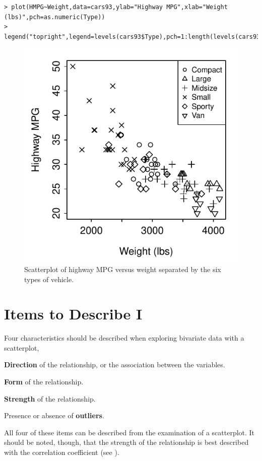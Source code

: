 \documentclass[10pt,openany]{book}\usepackage[]{graphicx}\usepackage[]{color}
\makeatletter
\newenvironment{kframe}{%
 \def\at@end@of@kframe{}%
 \ifinner\ifhmode%
  \def\at@end@of@kframe{\end{minipage}}%
  \begin{minipage}{\columnwidth}%
 \fi\fi%
 \def\FrameCommand##1{\hskip\@totalleftmargin \hskip-\fboxsep
 \colorbox{shadecolor}{##1}\hskip-\fboxsep
     \hskip-\linewidth \hskip-\@totalleftmargin \hskip\columnwidth}%
 \MakeFramed {\advance\hsize-\width
   \@totalleftmargin\z@ \linewidth\hsize
   \@setminipage}}%
 {\par\unskip\endMakeFramed%
 \at@end@of@kframe}
\newenvironment{knitrout}{}{} %
\makeatother
\begin{document}
\begin{knitrout}
\color{fgcolor}\begin{kframe}
\begin{verbatim}
> plot(HMPG~Weight,data=cars93,ylab="Highway MPG",xlab="Weight (lbs)",pch=as.numeric(Type))
> legend("topright",legend=levels(cars93$Type),pch=1:length(levels(cars93$Type)),cex=0.75)
\end{verbatim}
\end{kframe}\begin{figure}[hbtp]

{\centering \includegraphics[width=.4\linewidth]{Figs/Scatplot3-1} 

}

\caption[Scatterplot of highway MPG versus weight separated by the six types of vehicle]{Scatterplot of highway MPG versus weight separated by the six types of vehicle.}\label{fig:Scatplot3}
\end{figure}


\end{knitrout}

\begin{minipage}{\textwidth}
\section{Items to Describe I}
Four characteristics should be described when exploring bivariate data with a scatterplot,
\begin{Enumerate}
  \item \textbf{Direction} of the relationship, or the association between the variables.
  \item \textbf{Form} of the relationship.
  \item \textbf{Strength} of the relationship.
  \item Presence or absence of \textbf{outliers}.
\end{Enumerate}
All four of these items can be described from the examination of a scatterplot.  It should be noted, though, that the strength of the relationship is best described with the correlation coefficient (see ).
\end{minipage}
\end{document}
